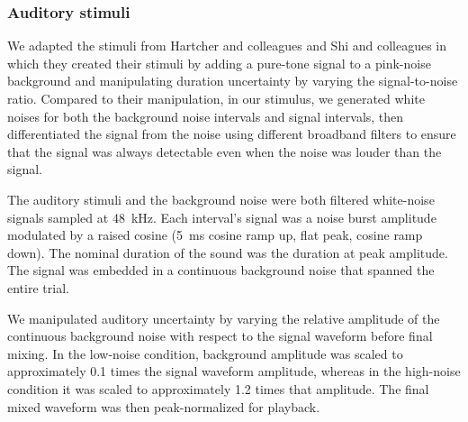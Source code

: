 \documentclass[9pt,lineno,doublespacing]{elife}
\begin{document}

\subsubsection{Auditory stimuli}

We adapted the stimuli from Hartcher and colleagues \citeyearpar{hartcher2014duration} and Shi and colleagues \citeyearpar{shi2013reducing} in which they created their stimuli by adding a pure-tone signal to a pink-noise background and manipulating duration uncertainty by varying the signal-to-noise ratio. Compared to their manipulation, in our stimulus, we generated white noises for both the background noise intervals and signal intervals, then differentiated the signal from the noise using different broadband filters to ensure that the signal was always detectable even when the noise was louder than the signal. 

The auditory stimuli and the background noise were both filtered white-noise signals sampled at 48~kHz. Each interval's signal was a noise burst amplitude modulated by a raised cosine (5~ms cosine ramp up, flat peak, cosine ramp down). The nominal duration of the sound was the duration at peak amplitude. The signal was embedded in a continuous background noise that spanned the entire trial. 

We manipulated auditory uncertainty by varying the relative amplitude of the continuous background noise with respect to the signal waveform before final mixing. In the low-noise condition, background amplitude was scaled to approximately 0.1 times the signal waveform amplitude, whereas in the high-noise condition it was scaled to approximately 1.2 times that amplitude. The final mixed waveform was then peak-normalized for playback.
\end{document}
